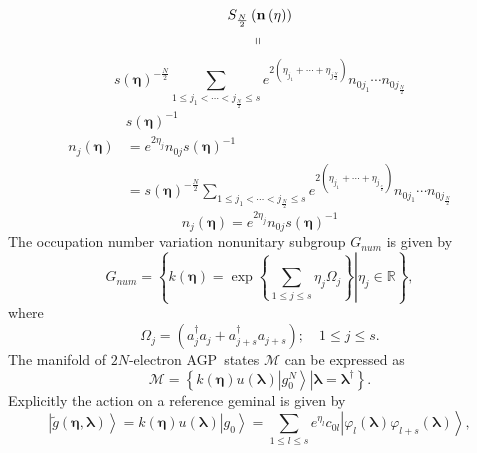 \documentclass[aps,preprint]{revtex4}%
\begin{document}
\begin{align*}
&  S_{\frac{N}{2}}\left(  \mathbf{n}\left(  \mathbf{\eta}\right)  \right) \\
&  \,\,\,\,\,\,\,\,\,\,\left.  \shortparallel\right.
\end{align*}%
\[
\mathit{s}\left(  \mathbf{\eta}\right)  ^{-\frac{N}{2}}\sum_{1\leq
j_{1}<\cdots<j_{\frac{N}{2}}\leq s}e^{2\left(  \eta_{j_{1}}+\cdots
+\eta_{j\frac{_{N}}{2}}\right)  }n_{0j_{1}}\cdots n_{0j_{\frac{N}{2}}}%
\]%
\begin{align}
&  \mathit{s}\left(  \mathbf{\eta}\right)  ^{-1}\\
n_{j}\left(  \mathbf{\eta}\right)   &  =e^{2\eta_{j}}n_{0j}\mathit{s}\left(
\mathbf{\eta}\right)  ^{-1}\\
&  =\mathit{s}\left(  \mathbf{\eta}\right)  ^{-\frac{N}{2}}\sum_{1\leq
j_{1}<\cdots<j_{\frac{N}{2}}\leq s}e^{2\left(  \eta_{j_{1}}+\cdots
+\eta_{j_{\frac{_{N}}{2}}}\right)  }n_{0j_{1}}\cdots n_{0j_{\frac{N}{2}}}%
\end{align}%
\[
n_{j}\left(  \mathbf{\eta}\right)  =e^{2\eta_{j}}n_{0j}\mathit{s}\left(
\mathbf{\eta}\right)  ^{-1}%
\]
The occupation number variation nonunitary subgroup $G_{num}$ is given by
\begin{equation}
G_{num}=\left\{  \left.  k\left(  \mathbf{\eta}\right)  =\exp\left\{
\sum_{1\leq j\leq s}\eta_{j}\Omega_{j}\right\}  \right\vert \eta_{j}%
\in\mathbb{R}\right\}  , \label{occup}%
\end{equation}
where
\begin{equation}
\Omega_{j}=\left(  a_{j}^{\dagger}a_{j}+a_{j+s}^{\dagger}a_{j+s}\right)
;\quad1\leq j\leq s.
\end{equation}
The manifold of $2N$-electron AGP\ states $\mathcal{M}$ can be expressed as
\begin{equation}
\mathcal{M}\mathcal{=}\left\{  \left.  \overset{}{k\left(  \mathbf{\eta
}\right)  u\left(  \mathbf{\lambda}\right)  }\left\vert g_{0}^{N}\right\rangle
\right\vert \right.  \left.  \mathbf{\lambda}=\mathbf{\lambda}^{\dagger
}\right\}  .
\end{equation}
Explicitly the action on a reference geminal is given by
\begin{equation}
\left\vert \tilde{g}\left(  \mathbf{\eta},\mathbf{\lambda}\right)
\right\rangle =k\left(  \mathbf{\eta}\right)  u\left(  \mathbf{\lambda
}\right)  \left\vert g_{0}\right\rangle =\sum_{1\leq l\leq s}e^{\eta_{l}%
}c_{0l}\left\vert \varphi_{l}\left(  \mathbf{\lambda}\right)  \varphi
_{l+s}\left(  \mathbf{\lambda}\right)  \right\rangle ,
\end{equation}
\end{document}
